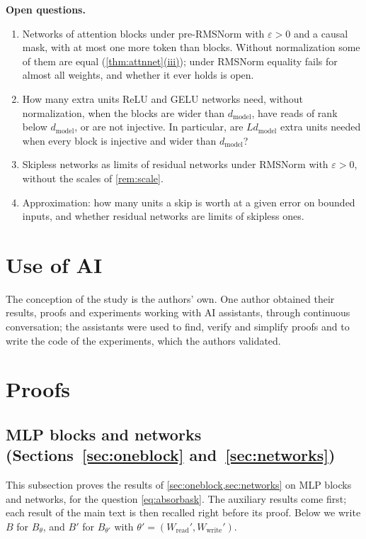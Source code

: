 \documentclass[10pt]{article}
\theoremstyle{definition}
\theoremstyle{remark}
\newcommand{\Wread}{W_{\mathrm{read}}}
\newcommand{\Wwrite}{W_{\mathrm{write}}}
\newcommand{\dm}{d_{\mathrm{model}}}
\newcommand{\para}[1]{\smallskip\noindent\textbf{#1}\hspace{0.5em}}
\DeclareRobustCommand{\cpref}[2]{\hyperref[#1:#2]{\cref*{#1}(#2)}}
\begin{document}
\para{Open questions.}
\begin{enumerate}[label=(\arabic*)]
\item Networks of attention blocks under pre-RMSNorm with $\varepsilon > 0$ and a causal mask, with at most one more token than blocks. Without normalization some of them are equal (\cpref{thm:attnnet}{iii}); under RMSNorm equality fails for almost all weights, and whether it ever holds is open.
\item How many extra units ReLU and GELU networks need, without normalization, when the blocks are wider than $\dm$, have reads of rank below $\dm$, or are not injective. In particular, are $L\dm$ extra units needed when every block is injective and wider than $\dm$?
\item Skipless networks as limits of residual networks under RMSNorm with $\varepsilon > 0$, without the scales of \cref{rem:scale}.
\item Approximation: how many units a skip is worth at a given error on bounded inputs, and whether residual networks are limits of skipless ones.
\end{enumerate}

\section*{Use of AI}
The conception of the study is the authors' own. One author obtained their results, proofs and experiments working with AI assistants, through continuous conversation; the assistants were used to find, verify and simplify proofs and to write the code of the experiments, which the authors validated.




\appendix
\section{Proofs}\label{app:proofs}

\subsection{MLP blocks and networks\texorpdfstring{ (Sections~\ref*{sec:oneblock} and~\ref*{sec:networks})}{}}\label{app:absorb}

This subsection proves the results of \cref{sec:oneblock,sec:networks} on MLP blocks and networks, for the question \eqref{eq:absorbask}. The auxiliary results come first; each result of the main text is then recalled right before its proof. Below we write $B$ for $B_\theta$, and $B'$ for $B_{\theta'}$ with $\theta' = (\Wread', \Wwrite')$.
\end{document}
